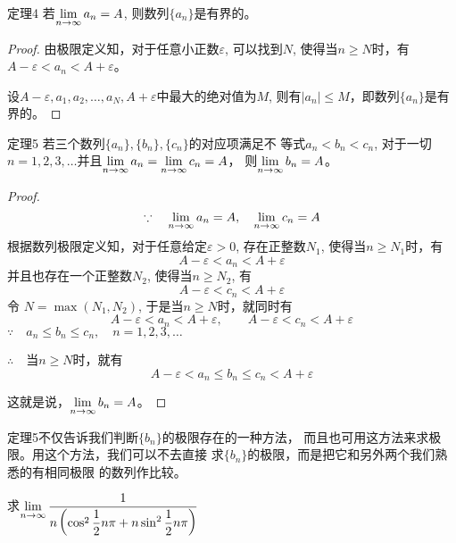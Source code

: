 \begin{blk}{定理4}
    若$\displaystyle\lim_{n\to\infty}a_n=A$, 则数列$\{a_n\}$是有界的。
\end{blk}    

\begin{proof}
由极限定义知，对于任意小正数$\varepsilon$, 可以找到$N$,
使得当$n\ge N$时，有
$A-\varepsilon<a_n<A+\varepsilon$。

设$A-\varepsilon,a_1,a_2,\ldots,a_N,A+\varepsilon$中最大的绝对值为$M$, 
则有$|a_n|\le M$，即数列$\{a_n\}$是有界的。
\end{proof}

\begin{blk}{定理5}
    若三个数列$\{a_n\},\{b_n\},\{c_n\}$的对应项满足不
等式$a_n<b_n<c_n$, 对于一切$n=1,2,3,\ldots$并且$\displaystyle\lim_{n\to\infty}a_n=\displaystyle\lim_{n\to\infty}c_n=A$，
则$\displaystyle\lim_{n\to\infty}b_n=A$。
\end{blk}

\begin{proof}
\[\because\quad \displaystyle\lim_{n\to\infty}a_n=A,\quad \displaystyle\lim_{n\to\infty}c_n=A\]
根据数列极限定义知，对于任意给定$\varepsilon >0$, 存在正整数$N_1$,
使得当$n\ge N_1$时，有
\[A-\varepsilon <a_n<A+\varepsilon\] 
并且也存在一个正整数$N_2$, 使得当$n\ge N_2$, 有
\[A-\varepsilon <c_n<A+\varepsilon\]
令 $N=\max(N_1,N_2)$, 于是当$n\ge N$时，就同时有
\[A-\varepsilon <a_n<A+\varepsilon ,\qquad A-\varepsilon <c_n<A+\varepsilon \]
$\because\quad a_n\le b_n\le c_n,\quad n=1,2,3,\ldots$

$\therefore\quad $当$n\ge N$时，就有
\[A-\varepsilon <a_n\le b_n\le c_n<A+\varepsilon\]

这就是说，$\displaystyle\lim_{n\to\infty}b_n=A$。
\end{proof}

定理5不仅告诉我们判断$\{b_n\}$的极限存在的一种方法，
而且也可用这方法来求极限。用这个方法，我们可以不去直接
求$\{b_n\}$的极限，而是把它和另外两个我们熟悉的有相同极限
的数列作比较。

\begin{example}
    求$\displaystyle\lim_{n\to\infty}\dfrac{1}{n\left(\cos^2\dfrac{1}{2}n\pi+n\sin^2\dfrac{1}{2}n\pi\right)}$
\end{example}

